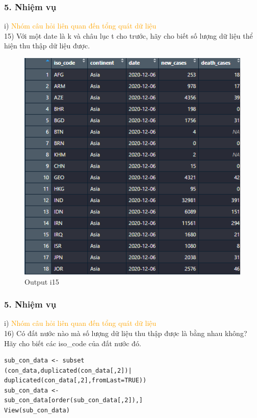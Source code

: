 \documentclass[english,10pt,table]{beamer}
\begin{document}
\begin{frame}[fragile]
\frametitle{5.  Nhiệm vụ}
	i) \textcolor{orange}{Nhóm câu hỏi liên quan đến tổng quát dữ liệu}\\
	15) Với một date là k và châu lục t cho trước, hãy cho biết số lượng dữ liệu thể hiện thu thập dữ liệu được.
	\begin{figure}[h!]
	\begin{center}
		    \includegraphics[scale = 0.7]{Images/I/I15.png}
		            \caption{Output i15}
		\end{center}
		\end{figure}
\end{frame}

\begin{frame}[fragile]
\frametitle{5.  Nhiệm vụ}
	i) \textcolor{orange}{Nhóm câu hỏi liên quan đến tổng quát dữ liệu}\\
	16) Có đất nước nào mà số lượng dữ liệu thu thập được là bằng nhau không? Hãy cho biết các iso\_code của đất nước đó.
		\begin{lstlisting}[frame=single]  
sub_con_data <- subset
(con_data,duplicated(con_data[,2])|
duplicated(con_data[,2],fromLast=TRUE))
sub_con_data <- 
sub_con_data[order(sub_con_data[,2]),]
View(sub_con_data)
	\end{lstlisting}
\end{frame}
\end{document}
